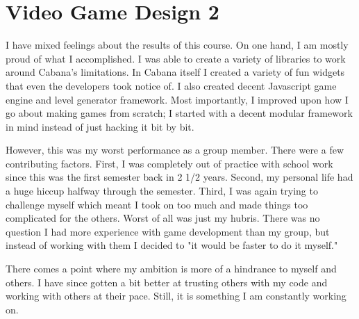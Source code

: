 \section{Video Game Design 2}

\begin{meta}
\end{meta}

\courseself
I have mixed feelings about the results of this course. On one hand, I
am mostly proud of what I accomplished. I was able to create a variety
of libraries to work around Cabana's limitations. In Cabana itself I
created a variety of fun widgets that even the developers took notice
of. I also created decent Javascript game engine and level generator
framework. Most importantly, I improved upon how I go about making games
from scratch; I started with a decent modular framework in mind instead
of just hacking it bit by bit.

However, this was my worst performance as a group member. There were
a few contributing factors. First, I was completely out of practice
with school work since this was the first semester back in 2 1/2 years.
Second, my personal life had a huge hiccup halfway through the semester.
Third, I was again trying to challenge myself which meant I took on too
much and made things too complicated for the others. Worst of all was
just my hubris. There was no question I had more experience with game
development than my group, but instead of working with them I decided to
"it would be faster to do it myself."

There comes a point where my ambition is more of a hindrance to myself
and others. I have since gotten a bit better at trusting others with my
code and working with others at their pace. Still, it is something I am
constantly working on.

